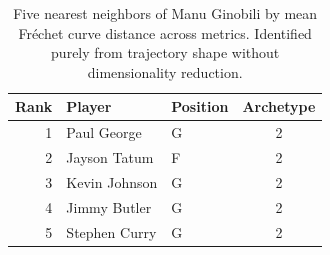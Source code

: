 \begin{table}[htbp]
  \centering\small
  \begin{tabular}{rllc}
    \toprule
    Rank & Player & Position & Archetype \\
    \midrule
    1 & Paul George & G & 2 \\
    2 & Jayson Tatum & F & 2 \\
    3 & Kevin Johnson & G & 2 \\
    4 & Jimmy Butler & G & 2 \\
    5 & Stephen Curry & G & 2 \\
    \bottomrule
  \end{tabular}
  \caption{Five nearest neighbors of Manu Ginobili by mean Fr\'{e}chet curve distance across metrics. Identified purely from trajectory shape without dimensionality reduction.}
  \label{tab:Manu_Ginobili_frechet_curve_neighbors}
\end{table}

